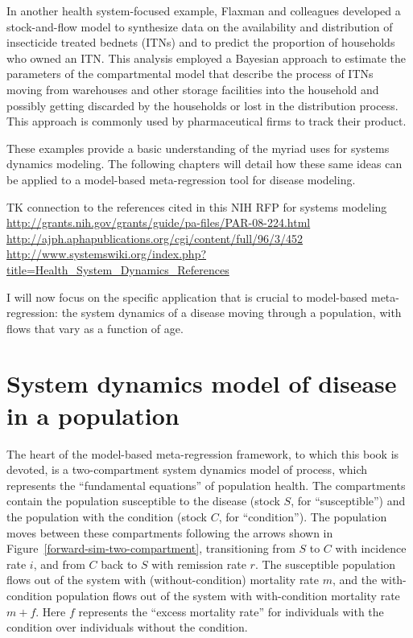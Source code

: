 In another health system-focused example, Flaxman and colleagues
developed a stock-and-flow model to synthesize data on the
availability and distribution of insecticide treated bednets (ITNs)
and to predict the proportion of households who owned an ITN. This
analysis employed a Bayesian approach to estimate the parameters of
the compartmental model that describe the process of ITNs moving from
warehouses and other storage facilities into the household and
possibly getting discarded by the households or lost in the
distribution process.  This approach is commonly used by
pharmaceutical firms to track their product.

These examples provide a basic understanding of the myriad uses for
systems dynamics modeling. The following chapters will detail how
these same ideas can be applied to a model-based meta-regression tool
for disease modeling.




TK connection to the references cited in this NIH RFP for systems modeling
\url{http://grants.nih.gov/grants/guide/pa-files/PAR-08-224.html}
\url{http://ajph.aphapublications.org/cgi/content/full/96/3/452}
\url{http://www.systemswiki.org/index.php?title=Health_System_Dynamics_References}




I will now focus on the specific application that is crucial to
model-based meta-regression: the system dynamics of a disease moving
through a population, with flows that vary as a function of age.

\section{System dynamics model of disease in a population}

The heart of the model-based meta-regression framework, to which this
book is devoted, is a two-compartment system dynamics model of
process, which represents the ``fundamental equations'' of population
health. The compartments contain the population susceptible to the
disease (stock $S$, for ``susceptible'') and the population with the
condition (stock $C$, for ``condition''). The population moves between
these compartments following the arrows shown in
Figure~\ref{forward-sim-two-compartment}, transitioning from $S$ to
$C$ with incidence rate $i$, and from $C$ back to $S$ with remission
rate $r$. The susceptible population flows out of the system with
(without-condition) mortality rate $m$, and the with-condition
population flows out of the system with with-condition mortality rate
$m+f$.  Here $f$ represents the ``excess mortality rate'' for
individuals with the condition over individuals without the condition.

